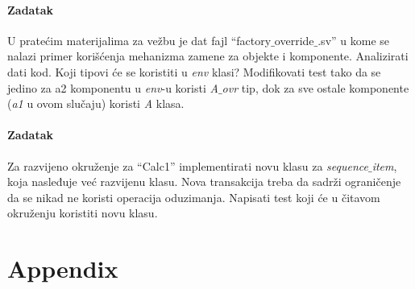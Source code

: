 \paragraph{Zadatak}

U pratećim materijalima za vežbu je dat fajl
``factory\(\_\)override\(\_\).sv'' u kome se nalazi primer korišćenja
mehanizma zamene za objekte i komponente. Analizirati dati kod. Koji tipovi će
se koristiti u \emph{env} klasi? Modifikovati test tako da se jedino za a2
komponentu u \emph{env}-u koristi \emph{A\(\_\)ovr} tip, dok za sve ostale
komponente (\emph{a1} u ovom slučaju) koristi \emph{A} klasa.

\paragraph{Zadatak}

Za razvijeno okruženje za ``Calc1'' implementirati novu klasu za
\emph{sequence\(\_\)item}, koja nasleđuje već razvijenu klasu. Nova transakcija
treba da sadrži ograničenje da se nikad ne koristi operacija oduzimanja.
Napisati test koji će u čitavom okruženju koristiti novu klasu.


\section{Appendix}




